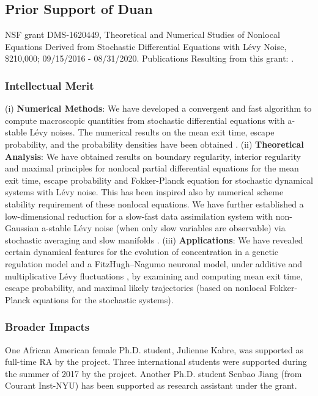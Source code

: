 \documentclass[11pt]{NSFamsart}
\begin{document}
  
 
\subsection*{Prior Support of Duan} NSF grant  DMS-1620449, Theoretical and Numerical Studies of Nonlocal Equations Derived from Stochastic Differential Equations with L\'evy Noise, \$210,000; 09/15/2016 - 08/31/2020. Publications Resulting from this grant:
 \cite{ChenWu, ChenXL2020,  DannyTesfay,GaoTing2016, Gao2016,    Liu2019LvyNI, Lv2016OnAS, QiaoDuan2018,Wang2018NumericalAF, YangDuanWiggins2020,ZhangZhuanDuan,ZhengDuan2017,ZhengYY2020}.

 
\subsubsection*{Intellectual Merit}
(i)  \textbf{Numerical Methods}:
    We have developed a convergent and fast algorithm to compute macroscopic quantities from stochastic differential equations  with a-stable L\'evy noises. The numerical results on the mean   exit time, escape probability,  and the probability densities have been obtained \cite{ChenXL2020, GaoTing2016, Gao2016,     Wang2018NumericalAF}.
(ii)  \textbf{Theoretical Analysis}:
We have obtained results on  boundary regularity, interior regularity and maximal principles for   nonlocal partial differential equations for the mean   exit time,   escape probability and Fokker-Planck equation for stochastic dynamical systems with L\'evy noise. This has been inspired also by numerical scheme stability requirement of these nonlocal equations. We have further established a  low-dimensional reduction for a slow-fast data assimilation system with non-Gaussian a-stable L\'evy noise (when only slow variables are observable) via stochastic averaging and slow manifolds \cite{Lv2016OnAS,QiaoDuan2018,   ZhangZhuanDuan,ZhengDuan2017,ZhengYY2020}.
(iii)   \textbf{Applications}:
   We have revealed certain  dynamical features  for  the evolution of concentration in a genetic regulation model \cite{ChenWu} and a
   FitzHugh–Nagumo   neuronal model,   under additive and multiplicative     L\'evy fluctuations \cite{Liu2019LvyNI}, by examining and computing mean exit time, escape probability, and maximal likely trajectories (based on nonlocal Fokker-Planck equations for the stochastic systems).


 \subsubsection*{Broader Impacts}
 One African American female Ph.D. student, Julienne Kabre, was supported as full-time RA by the project. Three international students were supported during the summer of 2017 by the project.    Another Ph.D. student Senbao Jiang (from Courant Inst-NYU)  has been supported as research assistant under the grant. 
 
\end{document}
